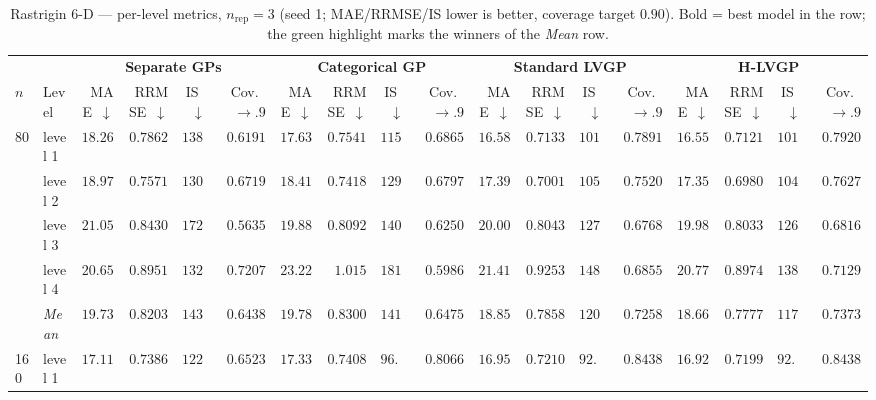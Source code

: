 \begin{table}[htbp]
\centering
\scriptsize
\setlength{\tabcolsep}{2.5pt}
\setlength{\fboxsep}{1pt}
\caption{Rastrigin 6-D --- per-level metrics, $n_{\mathrm{rep}}=3$ (seed 1; MAE/RRMSE/IS lower is better, coverage target $0.90$). Bold = best model in the row; the green highlight marks the winners of the \emph{Mean} row.}
\label{tab:rastrigin_6d_nrep03}
\begin{tabular}{llrrrrrrrrrrrrrrrr}
\toprule
 & & \multicolumn{4}{c}{\textbf{Separate GPs}} & \multicolumn{4}{c}{\textbf{Categorical GP}} & \multicolumn{4}{c}{\textbf{Standard LVGP}} & \multicolumn{4}{c}{\textbf{H-LVGP}} \\
\cmidrule(lr){3-6} \cmidrule(lr){7-10} \cmidrule(lr){11-14} \cmidrule(lr){15-18}
$n$ & Level & MAE~$\downarrow$ & RRMSE~$\downarrow$ & IS~$\downarrow$ & Cov.~$\to.9$ & MAE~$\downarrow$ & RRMSE~$\downarrow$ & IS~$\downarrow$ & Cov.~$\to.9$ & MAE~$\downarrow$ & RRMSE~$\downarrow$ & IS~$\downarrow$ & Cov.~$\to.9$ & MAE~$\downarrow$ & RRMSE~$\downarrow$ & IS~$\downarrow$ & Cov.~$\to.9$ \\
\midrule
\multirow{5}{*}{80} & level 1 & $18.26$ & $0.7862$ & $138.5$ & $0.6191$ & $17.63$ & $0.7541$ & $115.2$ & $0.6865$ & $16.58$ & $0.7133$ & $101.9$ & $0.7891$ & {\boldmath$16.55$} & {\boldmath$0.7121$} & {\boldmath$101.5$} & {\boldmath$0.7920$} \\
 & level 2 & $18.97$ & $0.7571$ & $130.0$ & $0.6719$ & $18.41$ & $0.7418$ & $129.0$ & $0.6797$ & $17.39$ & $0.7001$ & $105.7$ & $0.7520$ & {\boldmath$17.35$} & {\boldmath$0.6980$} & {\boldmath$104.5$} & {\boldmath$0.7627$} \\
 & level 3 & $21.05$ & $0.8430$ & $172.8$ & $0.5635$ & {\boldmath$19.88$} & $0.8092$ & $140.4$ & $0.6250$ & $20.00$ & $0.8043$ & $127.6$ & $0.6768$ & $19.98$ & {\boldmath$0.8033$} & {\boldmath$126.5$} & {\boldmath$0.6816$} \\
 & level 4 & {\boldmath$20.65$} & {\boldmath$0.8951$} & {\boldmath$132.5$} & {\boldmath$0.7207$} & $23.22$ & $1.015$ & $181.4$ & $0.5986$ & $21.41$ & $0.9253$ & $148.2$ & $0.6855$ & $20.77$ & $0.8974$ & $138.4$ & $0.7129$ \\
 & \textit{Mean} & $19.73$ & $0.8203$ & $143.5$ & $0.6438$ & $19.78$ & $0.8300$ & $141.5$ & $0.6475$ & $18.85$ & $0.7858$ & $120.8$ & $0.7258$ & \colorbox{green!20}{\boldmath$18.66$} & \colorbox{green!20}{\boldmath$0.7777$} & \colorbox{green!20}{\boldmath$117.7$} & \colorbox{green!20}{\boldmath$0.7373$} \\
\midrule
\multirow{5}{*}{160} & level 1 & $17.11$ & $0.7386$ & $122.9$ & $0.6523$ & $17.33$ & $0.7408$ & $96.27$ & $0.8066$ & $16.95$ & $0.7210$ & $92.94$ & {\boldmath$0.8438$} & {\boldmath$16.92$} & {\boldmath$0.7199$} & {\boldmath$92.73$} & $0.8438$ \\

\end{tabular}
\end{table}
